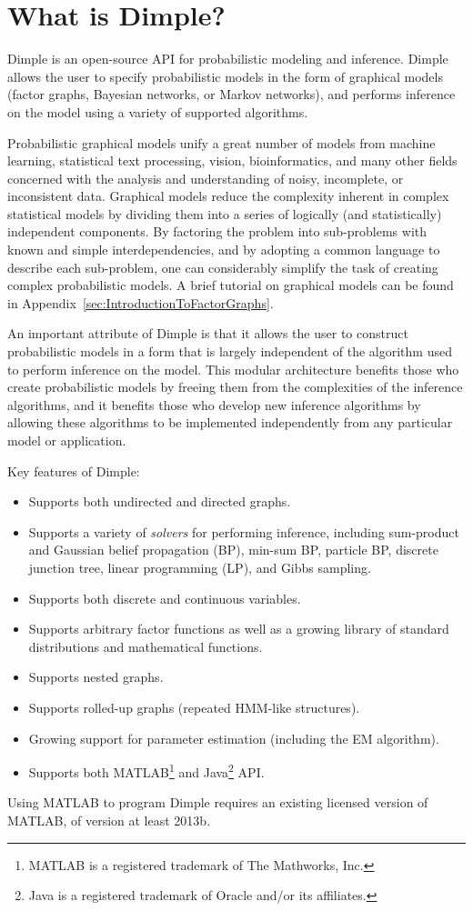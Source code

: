 \section{What is Dimple?}

Dimple is an open-source API for probabilistic modeling and inference. Dimple allows the user to specify probabilistic models in the form of graphical models (factor graphs, Bayesian networks, or Markov networks), and performs inference on the model using a variety of supported algorithms.

Probabilistic graphical models unify a great number of models from machine learning, statistical text processing, vision, bioinformatics, and many other fields concerned with the analysis and understanding of noisy, incomplete, or inconsistent data. Graphical models reduce the complexity inherent in complex statistical models by dividing them into a series of logically (and statistically) independent components. By factoring the problem into sub-problems with known and simple interdependencies, and by adopting a common language to describe each sub-problem, one can considerably simplify the task of creating complex probabilistic models.  A brief tutorial on graphical models can be found in Appendix~\ref{sec:IntroductionToFactorGraphs}.

An important attribute of Dimple is that it allows the user to construct probabilistic models in a form that is largely independent of the algorithm used to perform inference on the model. This modular architecture benefits those who create probabilistic models by freeing them from the complexities of the inference algorithms, and it benefits those who develop new inference algorithms by allowing these algorithms to be implemented independently from any particular model or application.

Key features of Dimple:
\begin{itemize}
\item Supports both undirected and directed graphs.
\item Supports a variety of \emph{solvers} for performing inference, including sum-product and Gaussian belief propagation (BP), min-sum BP, particle BP, discrete junction tree, linear programming (LP), and Gibbs sampling.
\item Supports both discrete and continuous variables.
\item Supports arbitrary factor functions as well as a growing library of standard distributions and mathematical functions.
\item Supports nested graphs.
\item Supports rolled-up graphs (repeated HMM-like structures).
\item Growing support for parameter estimation (including the EM algorithm).
\item Supports both MATLAB\footnote{MATLAB is a registered trademark of The Mathworks, Inc.} and Java\footnote{Java is a registered trademark of Oracle and/or its affiliates.} API.
\end{itemize}

\ifmatlab
Using MATLAB to program Dimple requires an existing licensed version of MATLAB, of version at least 2013b.
\fi
